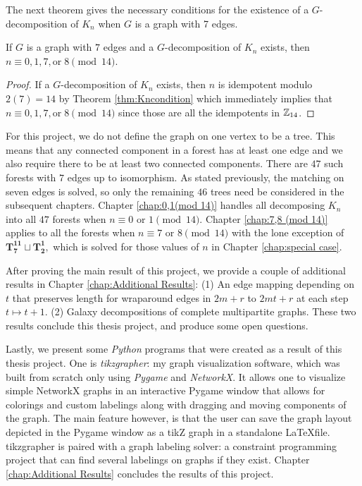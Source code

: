 The next theorem gives the necessary conditions for the existence of a $G$-decomposition of $K_n$ when $G$ is a graph with 7 edges.

\begin{thm}\label{thm:forestcondition}

  If $G$ is a graph with $7$ edges and a $G$-decomposition of $K_n$ exists, then $n \equiv 0,1,7, \textrm{or} \; 8 \pmod{14}$.

\end{thm}
\begin{proof}
    If a $G$-decomposition of $K_{n}$ exists, then $n$ is idempotent modulo $2(7)=14$ by Theorem \ref{thm:Kncondition} which immediately implies that $n \equiv 0,1,7, \textrm{or} \; 8 \pmod{14}$ since those are all the idempotents in $\mathbb{Z}_{14}$.
\end{proof}

For this project, we do not define the graph on one vertex to be a tree. This means that any connected component in a forest has at least one edge and we also require there to be at least two connected components. There are $47$ such forests with $7$ edges up to isomorphism.  As stated previously, the matching on seven edges is solved, so only the remaining $46$ trees need be considered in the subsequent chapters. Chapter \ref{chap:0,1(mod 14)} handles all decomposing $K_{n}$ into all $47$ forests when $n \equiv 0 \textrm{ or } 1 \pmod{14}$. Chapter \ref{chap:7,8 (mod 14)} applies to all the forests when $n \equiv 7 \textrm{ or } 8 \pmod{14}$ with the lone exception of $\mathbf{T_{7}^{11}}\sqcup\mathbf{T_{2}^{1}},$ which is solved for those values of $n$ in Chapter \ref{chap:special case}.

After proving the main result of this project, we provide a couple of additional results in Chapter \ref{chap:Additional Results}: (1) An edge mapping depending on $t$ that preserves length for wraparound edges in  $2m+r$ to $2mt+r$ at each step $t\mapsto t+1$. (2) Galaxy decompositions of complete multipartite graphs. These two results conclude this thesis project, and produce some open questions.

Lastly, we present some \textit{Python} programs that were created as a result of this thesis project. One is \textit{tikzgrapher}: my graph visualization software, which was built from scratch only using \textit{Pygame} and \textit{NetworkX}. It allows one to visualize simple NetworkX graphs in an interactive Pygame window that allows for colorings and custom labelings along with dragging and moving components of the graph. The main feature however, is that the user can save the graph layout depicted in the Pygame window as a tikZ graph in a standalone \LaTeX file. tikzgrapher is paired with a graph labeling solver: a constraint programming project that can find several labelings on graphs if they exist. Chapter \ref{chap:Additional Results} concludes the results of this project.




